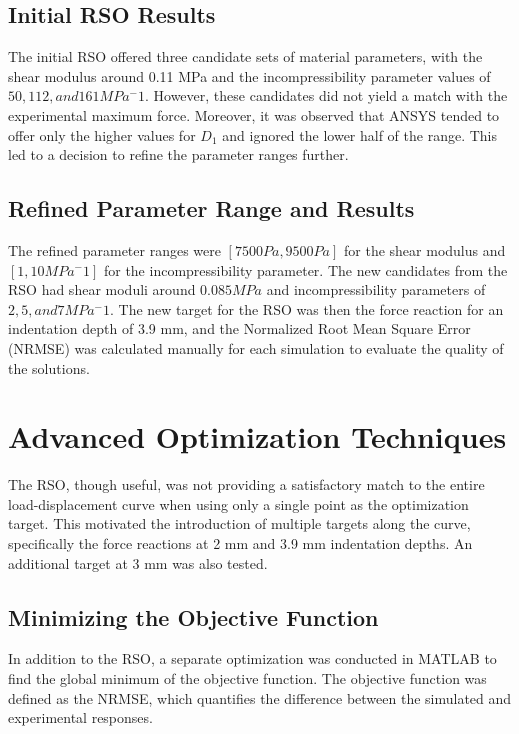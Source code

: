 \subsection{Initial RSO Results}

The initial RSO offered three candidate sets of material parameters, with the shear modulus around 0.11 MPa and the incompressibility parameter values of $50, 112, and 161 MPa^-1$. However, these candidates did not yield a match with the experimental maximum force. Moreover, it was observed that ANSYS tended to offer only the higher values for $D_1$ and ignored the lower half of the range. This led to a decision to refine the parameter ranges further.

\subsection{Refined Parameter Range and Results}

The refined parameter ranges were $[7500 Pa, 9500 Pa]$ for the shear modulus and $[1, 10 MPa^-1]$ for the incompressibility parameter. The new candidates from the RSO had shear moduli around $0.085 MPa$ and incompressibility parameters of $2, 5, and 7 MPa^-1$. The new target for the RSO was then the force reaction for an indentation depth of 3.9 mm, and the Normalized Root Mean Square Error (NRMSE) was calculated manually for each simulation to evaluate the quality of the solutions.

\section{Advanced Optimization Techniques}

The RSO, though useful, was not providing a satisfactory match to the entire load-displacement curve when using only a single point as the optimization target. This motivated the introduction of multiple targets along the curve, specifically the force reactions at 2 mm and 3.9 mm indentation depths. An additional target at 3 mm was also tested.

\subsection{Minimizing the Objective Function}

In addition to the RSO, a separate optimization was conducted in MATLAB to find the global minimum of the objective function. The objective function was defined as the NRMSE, which quantifies the difference between the simulated and experimental responses.

